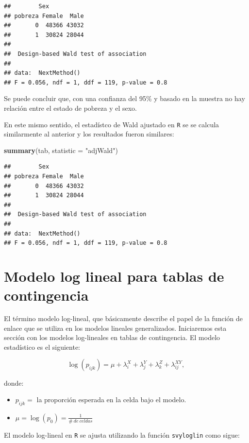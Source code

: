 \documentclass[
  12pt,
]{book}
\newenvironment{Shaded}{\begin{snugshade}}{\end{snugshade}}
\newcommand{\AttributeTok}[1]{\textcolor[rgb]{0.13,0.29,0.53}{#1}}
\newcommand{\FunctionTok}[1]{\textcolor[rgb]{0.13,0.29,0.53}{\textbf{#1}}}
\newcommand{\NormalTok}[1]{#1}
\newcommand{\StringTok}[1]{\textcolor[rgb]{0.31,0.60,0.02}{#1}}
\begin{document}
\begin{verbatim}
##        Sex
## pobreza Female  Male
##       0  48366 43032
##       1  30824 28044
## 
##  Design-based Wald test of association
## 
## data:  NextMethod()
## F = 0.056, ndf = 1, ddf = 119, p-value = 0.8
\end{verbatim}

Se puede concluir que, con una confianza del 95\% y basado en la muestra no hay relación entre el estado de pobreza y el sexo.

En este mismo sentido, el estadístco de Wald ajustado en \texttt{R} se se calcula similarmente al anterior y los resultados fueron similares:

\begin{Shaded}
\begin{Highlighting}[]
\FunctionTok{summary}\NormalTok{(tab, }\AttributeTok{statistic =} \StringTok{"adjWald"}\NormalTok{)}
\end{Highlighting}
\end{Shaded}

\begin{verbatim}
##        Sex
## pobreza Female  Male
##       0  48366 43032
##       1  30824 28044
## 
##  Design-based Wald test of association
## 
## data:  NextMethod()
## F = 0.056, ndf = 1, ddf = 119, p-value = 0.8
\end{verbatim}

\section{Modelo log lineal para tablas de contingencia}\label{modelo-log-lineal-para-tablas-de-contingencia}

El término modelo log-lineal, que básicamente describe el papel de la función de enlace que se utiliza en los modelos lineales generalizados. Iniciaremos esta sección con los modelos log-lineales en tablas de contingencia. El modelo estadístico es el siguiente:

\[
  \log(p_{ijk}) = \mu + \lambda_i^X + \lambda_j^Y + \lambda_k^Z + \lambda_{ij}^{XY}  ,   
\]

donde:

\begin{itemize}
\item
  \(p_{ijk}=\) la proporción esperada en la celda bajo el modelo.
\item
  \(\mu = \log(p_{0})=\frac{1}{\#\ de\ celdas}\)
\end{itemize}

El modelo log-lineal en \texttt{R} se ajusta utilizando la función \texttt{svyloglin} como sigue:
\end{document}
